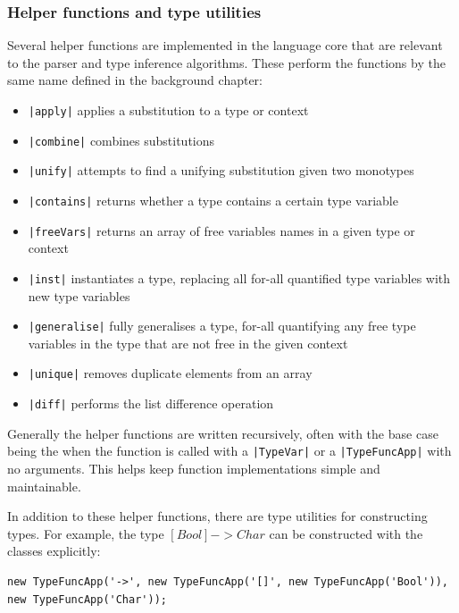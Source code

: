 \documentclass[a4paper,fleqn,12pt]{article}
\begin{document}
\subsubsection{Helper functions and type utilities}\label{id:h.sw77qek8b49p}
Several helper functions are implemented in the language core that are relevant to the parser and type inference algorithms. These perform the functions by the same name defined in the background chapter:
\begin{itemize}
  \item \texttt{|apply|} applies a substitution to a type or context
  \item \texttt{|combine|} combines substitutions
  \item \texttt{|unify|} attempts to find a unifying substitution given two monotypes
  \item \texttt{|contains|} returns whether a type contains a certain type variable
  \item \texttt{|freeVars|} returns an array of free variables names in a given type or context
  \item \texttt{|inst|} instantiates a type, replacing all for-all quantified type variables with new type variables
  \item \texttt{|generalise|} fully generalises a type, for-all quantifying any free type variables in the type that are not free in the given context
  \item \texttt{|unique|} removes duplicate elements from an array
  \item \texttt{|diff|} performs the list difference operation
\end{itemize}

Generally the helper functions are written recursively, often with the base case being the when the function is called with a \texttt{|TypeVar|} or a \texttt{|TypeFuncApp|} with no arguments. This helps keep function implementations simple and maintainable.

In addition to these helper functions, there are type utilities for constructing types. For example, the type $[Bool] -> Char$ can be constructed with the classes explicitly:

\begin{verbatim}
new TypeFuncApp('->', new TypeFuncApp('[]', new TypeFuncApp('Bool')), new TypeFuncApp('Char'));
\end{verbatim}
\end{document}
